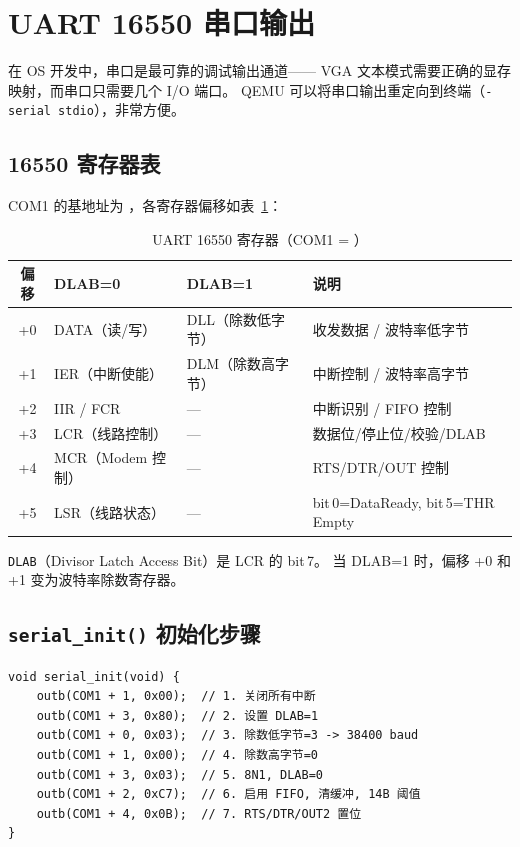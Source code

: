 \section{UART 16550 串口输出}
\label{sec:serial}

在 OS 开发中，串口是最可靠的调试输出通道——
VGA 文本模式需要正确的显存映射，而串口只需要几个 I/O 端口。
QEMU 可以将串口输出重定向到终端（\texttt{-serial stdio}），非常方便。

\subsection{16550 寄存器表}

COM1 的基地址为 ，各寄存器偏移如表~\ref{tab:uart-regs}：

\begin{table}[H]
\centering
\begin{tabular}{cllp{5.5cm}}
\toprule
\textbf{偏移} & \textbf{DLAB=0} & \textbf{DLAB=1} & \textbf{说明} \\
\midrule
+0 & DATA（读/写） & DLL（除数低字节） & 收发数据 / 波特率低字节 \\
+1 & IER（中断使能） & DLM（除数高字节） & 中断控制 / 波特率高字节 \\
+2 & IIR / FCR & — & 中断识别 / FIFO 控制 \\
+3 & LCR（线路控制） & — & 数据位/停止位/校验/DLAB \\
+4 & MCR（Modem 控制） & — & RTS/DTR/OUT 控制 \\
+5 & LSR（线路状态） & — & bit\,0=DataReady, bit\,5=THR Empty \\
\bottomrule
\end{tabular}
\caption{UART 16550 寄存器（COM1 = ）}
\label{tab:uart-regs}
\end{table}

\texttt{DLAB}（Divisor Latch Access Bit）是 LCR 的 bit\,7。
当 DLAB=1 时，偏移 +0 和 +1 变为波特率除数寄存器。

\subsection{\texttt{serial\_init()} 初始化步骤}

\begin{lstlisting}[style=cstyle]
void serial_init(void) {
    outb(COM1 + 1, 0x00);  // 1. 关闭所有中断
    outb(COM1 + 3, 0x80);  // 2. 设置 DLAB=1
    outb(COM1 + 0, 0x03);  // 3. 除数低字节=3 -> 38400 baud
    outb(COM1 + 1, 0x00);  // 4. 除数高字节=0
    outb(COM1 + 3, 0x03);  // 5. 8N1, DLAB=0
    outb(COM1 + 2, 0xC7);  // 6. 启用 FIFO, 清缓冲, 14B 阈值
    outb(COM1 + 4, 0x0B);  // 7. RTS/DTR/OUT2 置位
}
\end{lstlisting}

